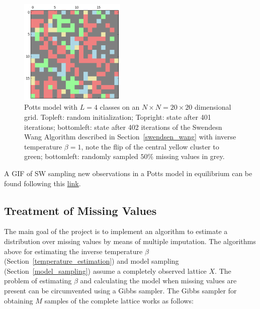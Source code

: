 \documentclass[12pt, twoside]{article}
\newcommand{\1}{\mathbb{1}}
\begin{document}
\begin{figure}
	\includegraphics[width=0.45\textwidth]{plots/grid_b1_it402_missing.png}
	\caption{Potts model with $L = 4$ classes on an $N \times N = 20 \times 20$ dimensional grid. Topleft: random initialization; Topright: state after 401 iterations; bottomleft: state after 402 iterations of the Swendesn Wang Algorithm described in Section~\ref{swendsen_wang} with inverse temperature $\beta = 1$, note the flip of the central yellow cluster to green; bottomleft: randomly sampled $50\%$ missing values in grey.}
	\label{fig:potts_models}
\end{figure}
%
A GIF of SW sampling new observations in a Potts model in equilibrium can be found following this \href{https://github.com/maierhofert/2DPottsModel/blob/master/plots/grid_SW_equilibrium.gif}{\underline{link}}.


\subsection{Treatment of Missing Values}\label{treatment_of_missing_values}
The main goal of the project is to implement an algorithm to estimate a distribution over missing values by means of multiple imputation. The algorithms above for estimating the inverse temperature $\beta$ (Section~\ref{temperature_estimation}) 
and model sampling (Section~\ref{model_sampling}) assume a completely observed lattice $X$. The problem of estimating $\beta$ and calculating the model when missing values are present can be circumvented using a Gibbs sampler.
The Gibbs sampler for obtaining $M$ samples of the complete lattice works as follows: \\
\end{document}

